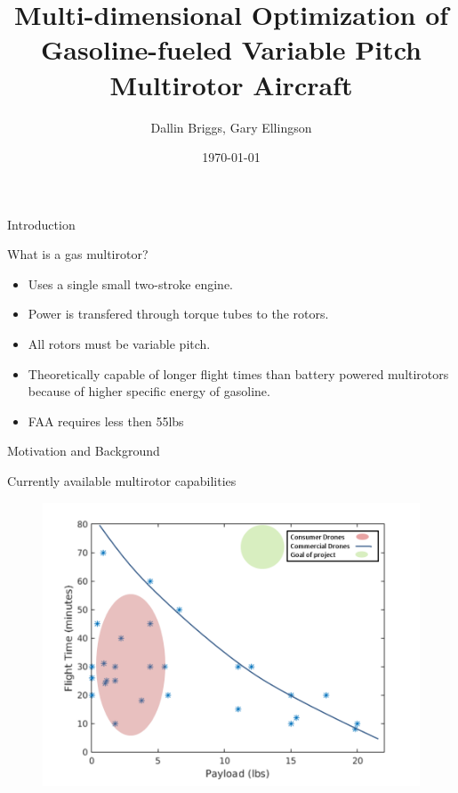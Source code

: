 \documentclass{beamer}
\title{Multi-dimensional Optimization of Gasoline-fueled Variable Pitch Multirotor Aircraft}
\author{Dallin Briggs, Gary Ellingson}
\institute[MAGICC Lab]{\texttt{[image: logo\_gray]}}
\date{\today}
\begin{document}
\begin{frame}
\titlepage
\end{frame}


\begin{frame}{Introduction}

	What is a gas multirotor?
	\begin{itemize}
	\item{Uses a single small two-stroke engine.}
	\item{Power is transfered through torque tubes to the rotors.}
	\item{All rotors must be variable pitch.}
	\item{Theoretically capable of longer flight times than battery powered multirotors because of higher specific energy of gasoline.}
	\item{FAA requires less then 55lbs}
	\end{itemize}
\end{frame}

\begin{frame}{Motivation and Background}
	\begin{center}
	Currently available multirotor capabilities
	\end{center}
	\begin{figure}
		\begin{center}
			\includegraphics[width=.70\textwidth]{../current_capabilities.png}
			\label{current_capabilities}
		\end{center}
	\end{figure}
\end{frame}
\end{document}
